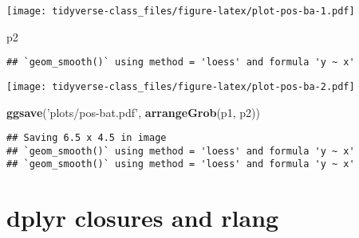 \documentclass[]{book}
\newenvironment{Shaded}{\begin{snugshade}}{\end{snugshade}}
\newcommand{\KeywordTok}[1]{\textcolor[rgb]{0.13,0.29,0.53}{\textbf{#1}}}
\newcommand{\StringTok}[1]{\textcolor[rgb]{0.31,0.60,0.02}{#1}}
\newcommand{\NormalTok}[1]{#1}
\begin{document}
\texttt{[image: tidyverse-class\_files/figure-latex/plot-pos-ba-1.pdf]}

\begin{Shaded}
\begin{Highlighting}[]
\NormalTok{p2}
\end{Highlighting}
\end{Shaded}

\begin{verbatim}
## `geom_smooth()` using method = 'loess' and formula 'y ~ x'
\end{verbatim}

\texttt{[image: tidyverse-class\_files/figure-latex/plot-pos-ba-2.pdf]}

\begin{Shaded}
\begin{Highlighting}[]
\KeywordTok{ggsave}\NormalTok{(}\StringTok{'plots/pos-bat.pdf'}\NormalTok{, }\KeywordTok{arrangeGrob}\NormalTok{(p1, p2))}
\end{Highlighting}
\end{Shaded}

\begin{verbatim}
## Saving 6.5 x 4.5 in image
## `geom_smooth()` using method = 'loess' and formula 'y ~ x'
## `geom_smooth()` using method = 'loess' and formula 'y ~ x'
\end{verbatim}

\chapter{dplyr closures and rlang}\label{ch:rlang}
\end{document}

